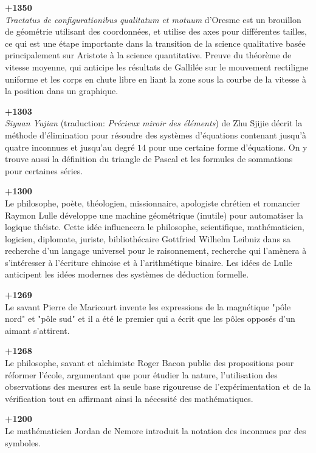 \textbf{+1350}\\
\textit{Tractatus de configurationibus qualitatum et motuum} d'Oresme est un brouillon de géométrie utilisant des coordonnées, et utilise des axes pour différentes tailles, ce qui est une étape importante dans la transition de la science qualitative basée principalement sur Aristote à la science quantitative. Preuve du théorème de vitesse moyenne, qui anticipe les résultats de Gallilée sur le mouvement rectiligne uniforme et les corps en chute libre en liant la zone sous la courbe de la vitesse à la position dans un graphique.

\textbf{+1303}\\
\textit{Siyuan Yujian} (traduction: \textit{Précieux miroir des éléments}) de Zhu Sjijie décrit la méthode d'élimination pour résoudre des systèmes d'équations contenant jusqu'à quatre inconnues et jusqu'au degré $14$ pour une certaine forme d'équations. On y trouve aussi la définition du triangle de Pascal et les formules de sommations pour certaines séries.

\textbf{+1300}\\
Le philosophe, poète, théologien, missionnaire, apologiste chrétien et romancier Raymon Lulle développe une machine géométrique (inutile) pour automatiser la logique théiste. Cette idée influencera le  philosophe, scientifique, mathématicien, logicien, diplomate, juriste, bibliothécaire Gottfried Wilhelm Leibniz dans sa recherche d'un langage universel pour le raisonnement, recherche qui l'amènera à s'intéresser à l'écriture chinoise et à l'arithmétique binaire. Les idées de Lulle anticipent les idées modernes des systèmes de déduction formelle.

\textbf{+1269}\\
Le savant Pierre de Maricourt invente les expressions de la magnétique "pôle nord" et "pôle sud" et il a été le premier qui a écrit que les pôles opposés d'un aimant s'attirent.

\textbf{+1268}\\
Le philosophe, savant et alchimiste Roger Bacon publie des propositions pour réformer l'école, argumentant que pour étudier la nature, l'utilisation des observations des mesures est la seule base rigoureuse de l'expérimentation et de la vérification tout en affirmant ainsi la nécessité des mathématiques.

\textbf{+1200}\\
Le mathématicien Jordan de Nemore introduit la notation des inconnues par des symboles.

